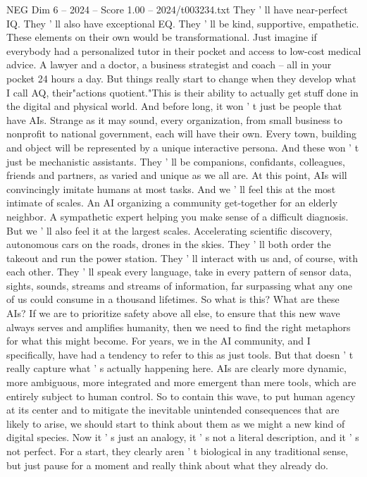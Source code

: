 \begin{textsample}{NEG Dim 6 – 2024 – Score 1.00 – 2024/t003234.txt}
They ' ll have near-perfect IQ.
They ' ll also have exceptional EQ.
They ' ll be kind, supportive, empathetic.
These elements on their own would be transformational.
Just imagine if everybody had a personalized tutor in their pocket and access to low-cost medical advice.
A lawyer and a doctor, a business strategist and coach -- all in your pocket 24 hours a day.
But things really start to change when they develop what I call AQ, their"actions quotient."This is their ability to actually get stuff done in the digital and physical world.
And before long, it won ' t just be people that have AIs.
Strange as it may sound, every organization, from small business to nonprofit to national government, each will have their own.
Every town, building and object will be represented by a unique interactive persona.
And these won ' t just be mechanistic assistants.
They ' ll be companions, confidants, colleagues, friends and partners, as varied and unique as we all are.
At this point, AIs will convincingly imitate humans at most tasks.
And we ' ll feel this at the most intimate of scales.
An AI organizing a community get-together for an elderly neighbor.
A sympathetic expert helping you make sense of a difficult diagnosis.
But we ' ll also feel it at the largest scales.
Accelerating scientific discovery, autonomous cars on the roads, drones in the skies.
They ' ll both order the takeout and run the power station.
They ' ll interact with us and, of course, with each other.
They ' ll speak every language, take in every pattern of sensor data, sights, sounds, streams and streams of information, far surpassing what any one of us could consume in a thousand lifetimes.
So what is this?
What are these AIs?
If we are to prioritize safety above all else, to ensure that this new wave always serves and amplifies humanity, then we need to find the right metaphors for what this might become.
For years, we in the AI community, and I specifically, have had a tendency to refer to this as just tools.
But that doesn ' t really capture what ' s actually happening here.
AIs are clearly more dynamic, more ambiguous, more integrated and more emergent than mere tools, which are entirely subject to human control.
So to contain this wave, to put human agency at its center and to mitigate the inevitable unintended consequences that are likely to arise, we should start to think about them as we might a new kind of digital species.
Now it ' s just an analogy, it ' s not a literal description, and it ' s not perfect.
For a start, they clearly aren ' t biological in any traditional sense, but just pause for a moment and really think about what they already do.

\end{textsample}
